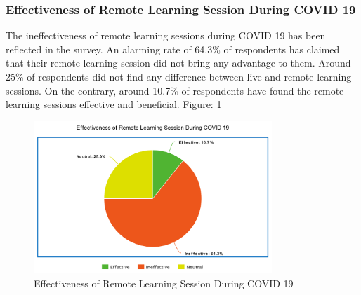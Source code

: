 \documentclass[11pt]{article}
\begin{document}
\subsubsection{Effectiveness of Remote Learning Session During COVID 19}
The ineffectiveness of remote learning sessions during COVID 19 has been reflected in the survey. An alarming rate of 64.3\% of respondents has claimed that their remote learning session did not bring any advantage to them. Around 25\% of respondents did not find any difference between live and remote learning sessions. On the contrary, around 10.7\% of respondents have found the remote learning sessions effective and beneficial. Figure: \ref{Remote Learning}
\begin{figure}[!ht]
	\centering
	\includegraphics[width=0.8\textwidth]{Images/Collaboration/Remote Learning.png}
	\caption{Effectiveness of Remote Learning Session During COVID 19}
	\centering
	\label{Remote Learning}
\end{figure}
\end{document}
